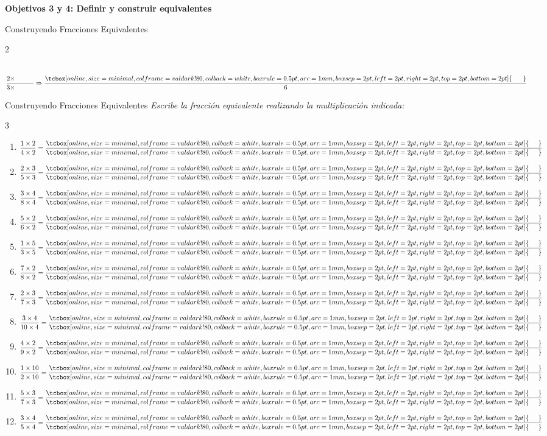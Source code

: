\documentclass[12pt, letterpaper]{article}
\newenvironment{objetivo}[1]{%
    \begin{tcolorbox}[colback=valblue!10, colframe=valblue, arc=2mm, boxrule=1.5pt]
        {\large\bfseries \ding{118} #1}
    \end{tcolorbox}
}{}
\newcommand{\boxfill}[1][0.8cm]{\tcbox[on line, size=minimal, colframe=valdark!80, colback=white, boxrule=0.5pt, arc=1mm, boxsep=2pt, left=2pt, right=2pt, top=2pt, bottom=2pt]{\makebox[#1]{\vphantom{M}}}}
\begin{document}
\begin{objetivo}{Objetivos 3 y 4: Definir y construir equivalentes}
\begin{practica}{Construyendo Fracciones Equivalentes}
\begin{multicols}{2}
\begin{center}
\\[0.3cm]
            \Large $\dfrac{2\times\hspace{1cm}}{3\times\hspace{1cm}} \Rightarrow \dfrac{\boxfill[0.6cm]}{6}$
        \end{center}
    \end{multicols}
\end{practica}
\newpage
    \begin{practica}{Construyendo Fracciones Equivalentes}
        \textit{Escribe la fracción equivalente realizando la multiplicación indicada:}
        \vspace{0.2cm}
        \begin{multicols}{3}
            \raggedcolumns
            \begin{enumerate}[itemsep=0.4cm]
                \item $\dfrac{1\times2}{4\times2} = \dfrac{\boxfill[0.5cm]}{\boxfill[0.5cm]}$
                \item $\dfrac{2\times3}{5\times3} = \dfrac{\boxfill[0.5cm]}{\boxfill[0.5cm]}$
                \item $\dfrac{3\times4}{8\times4} = \dfrac{\boxfill[0.5cm]}{\boxfill[0.5cm]}$
                \item $\dfrac{5\times2}{6\times2} = \dfrac{\boxfill[0.5cm]}{\boxfill[0.5cm]}$
                \item $\dfrac{1\times5}{3\times5}  = \dfrac{\boxfill[0.5cm]}{\boxfill[0.5cm]}$
                \item $\dfrac{7\times2}{8\times2} = \dfrac{\boxfill[0.5cm]}{\boxfill[0.5cm]}$
                \item $\dfrac{2\times3}{7\times3} = \dfrac{\boxfill[0.5cm]}{\boxfill[0.5cm]}$
                \item $\dfrac{3\times4}{10\times4}  = \dfrac{\boxfill[0.5cm]}{\boxfill[0.5cm]}$
                \item $\dfrac{4\times2}{9\times2} = \dfrac{\boxfill[0.5cm]}{\boxfill[0.5cm]}$
                \item $\dfrac{1\times10}{2\times10} = \dfrac{\boxfill[0.5cm]}{\boxfill[0.5cm]}$
                \item $\dfrac{5\times3}{7\times3} = \dfrac{\boxfill[0.5cm]}{\boxfill[0.5cm]}$
                \item $\dfrac{3\times4}{5\times4} = \dfrac{\boxfill[0.5cm]}{\boxfill[0.5cm]}$

\end{enumerate}
\end{multicols}
\end{practica}
\end{objetivo}
\end{document}
